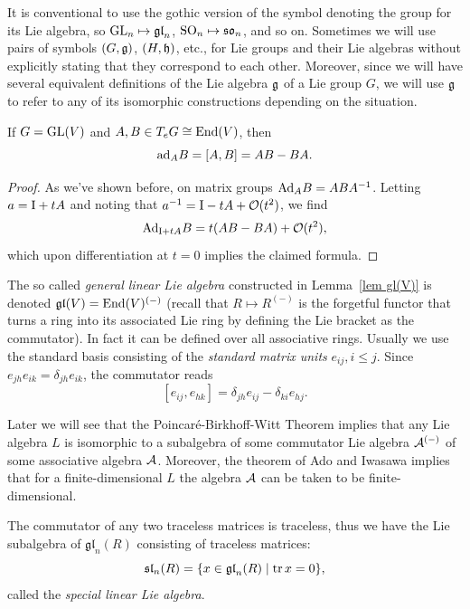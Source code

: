 \begin{rem}
    It is conventional to use the gothic version of the symbol denoting the group for its Lie algebra, so $\operatorname{GL}_n\mapsto \mathfrak{gl}_n$, $\operatorname{SO}_n\mapsto \mathfrak{so}_n$, and so on. Sometimes we will use pairs of symbols $(G,\mathfrak{g})$, $(H,\mathfrak{h})$, etc., for Lie groups and their Lie algebras without explicitly stating that they correspond to each other. Moreover, since we will have several equivalent definitions of the Lie algebra $\mathfrak{g}$ of a Lie group $G$, we will use $\mathfrak{g}$ to refer to any of its isomorphic constructions depending on the situation.
\end{rem}

\begin{lem}\label{lem gl(V)}
    If $G=\operatorname{GL}(V)$ and $A,B\in T_e G\cong \operatorname{End}(V)$, then 
    \[\mathrm{ad}_A B=[A,B]=AB-BA.\]
\end{lem}
\begin{proof}
    As we've shown before, on matrix groups $\mathrm{Ad}_A B=ABA^{-1}$. Letting $a=\mathrm{I}+tA$ and noting that $a^{-1}=\mathrm{I}-tA+\mathcal{O}(t^2)$, we find
    \[\mathrm{Ad}_{\mathrm{I}+tA} B=t(AB-BA)+\mathcal{O}(t^2),\]
    which upon differentiation at $t=0$ implies the claimed formula.
\end{proof}


\begin{example}[$\mathfrak{gl}_n(R)$]
    The so called \emph{general linear Lie algebra} constructed in Lemma~\ref{lem gl(V)} is denoted $\mathfrak{gl}(V)=\operatorname{End}(V)^{(-)}$ (recall that $R\mapsto R^{(-)}$ is the forgetful functor that turns a ring into its associated Lie ring by defining the Lie bracket as the commutator). In fact it can be defined over all associative rings. Usually we use the standard basis consisting of the \emph{standard matrix units} $e_{ij},i\leq j$. Since $e_{jh}e_{ik}=\delta_{jh}e_{ik}$, the commutator reads
    \[[e_{ij},e_{hk}]=\delta_{jh}e_{ij}-\delta_{ki}e_{hj}.\]

    Later we will see that the Poincar\'e-Birkhoff-Witt Theorem implies that any Lie algebra $L$ is isomorphic to a subalgebra of some commutator Lie algebra $\mathcal{A}^{(-)}$ of some associative algebra $\mathcal{A}$. Moreover, the theorem of Ado and Iwasawa implies that for a finite-dimensional $L$ the algebra $\mathcal{A}$ can be taken to be finite-dimensional.
\end{example}

\begin{example}[$\mathfrak{sl}_n(R)$]
    The commutator of any two traceless matrices is traceless, thus we have the Lie subalgebra of $\mathfrak{gl}_n(R)$ consisting of traceless matrices:
    \[\mathfrak{sl}_n(R)=\{x\in \mathfrak{gl}_n(R)\mid \operatorname{tr} x=0\},\]
    called the \emph{special linear Lie algebra}.
\end{example}

